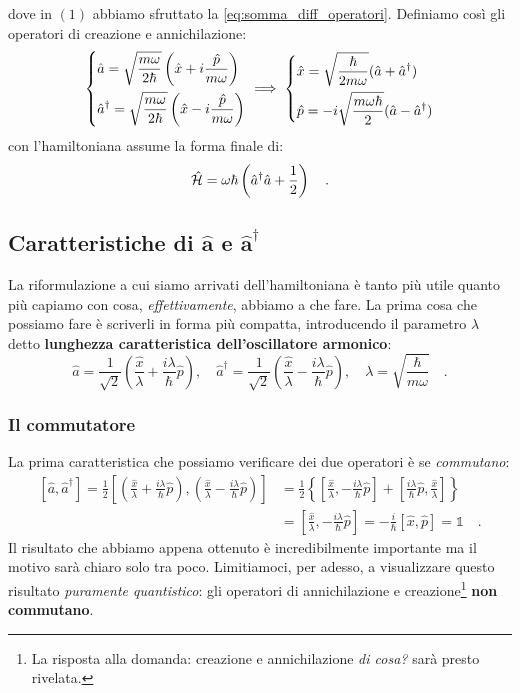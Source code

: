 dove in $(1)$ abbiamo sfruttato la \eqref{eq:somma_diff_operatori}. Definiamo così gli operatori di creazione e annichilazione:
\[
\begin{dcases}
    \hat{a} = \sqrt{\frac{m\omega}{2\hbar}}\left(\hat{x} + i\frac{\hat{p}}{m\omega}\right) \\
    \hat{a}^\dagger = \sqrt{\frac{m\omega}{2\hbar}}\left(\hat{x} - i\frac{\hat{p}}{m\omega} \right)
\end{dcases}
\implies 
\begin{dcases}
    \hat{x} = \sqrt{\frac{\hbar}{2m\omega}}(\hat{a}+ \hat{a}^\dagger) \\
    \hat{p} = -i\sqrt{\frac{m\omega\hbar}{2}}(\hat{a} - \hat{a}^\dagger) 
\end{dcases}
\]
con l'hamiltoniana assume la forma finale di:
\[
    \hat{\mathcal{H}} = \omega \hbar\left( \hat{a}^\dagger\hat{a} + \frac{1}{2} \right) \quad. 
\]

\subsection{Caratteristiche di \texorpdfstring{$\bm{\hat{a}}$}{a} e \texorpdfstring{$\bm{\hat{a}^\dagger}$}{a dagger}}
La riformulazione a cui siamo arrivati dell'hamiltoniana è tanto più utile quanto più capiamo con cosa, \emph{effettivamente}, abbiamo a che fare. La prima cosa che possiamo fare è scriverli in forma più compatta, introducendo il parametro $\lambda$ detto \textbf{lunghezza caratteristica dell'oscillatore armonico}:
\[
    \hat{a} = \frac{1}{\sqrt{2}}\left( \frac{\hat{x}}{\lambda} + \frac{i\lambda}{\hbar}\hat{p} \right), \quad \hat{a}^\dagger = \frac{1}{\sqrt{2}}\left( \frac{\hat{x}}{\lambda} - \frac{i\lambda}{\hbar}\hat{p} \right), \quad \lambda = \sqrt{\frac{\hbar}{m\omega}} \quad.
\]

\subsubsection{Il commutatore}
La prima caratteristica che possiamo verificare dei due operatori è se \emph{commutano}:
\[
\begin{aligned}
    [\hat{a}, \hat{a}^\dagger] = \frac{1}{2}\left[\left( \frac{\hat{x}}{\lambda} + \frac{i\lambda}{\hbar}\hat{p} \right), \left( \frac{\hat{x}}{\lambda} - \frac{i\lambda}{\hbar}\hat{p} \right) \right] &= \frac{1}{2}\left\{ \left[ \frac{\hat{x}}{\lambda},  -\frac{i\lambda}{\hbar}\hat{p}\right] + \left[\frac{i\lambda}{\hbar}\hat{p}, \frac{\hat{x}}{\lambda}\right]\right\} \\
    &= \left[ \frac{\hat{x}}{\lambda},  -\frac{i\lambda}{\hbar}\hat{p}\right] = -\frac{i}{\hbar}[\hat{x},\hat{p}] = \mathds{1} \quad.
\end{aligned}
\]
Il risultato che abbiamo appena ottenuto è incredibilmente importante ma il motivo sarà chiaro solo tra poco. Limitiamoci, per adesso, a visualizzare questo risultato \emph{puramente quantistico}: gli operatori di annichilazione e creazione\footnote{La risposta alla domanda: creazione e annichilazione \emph{di cosa?} sarà presto rivelata.} \textbf{non commutano}.

